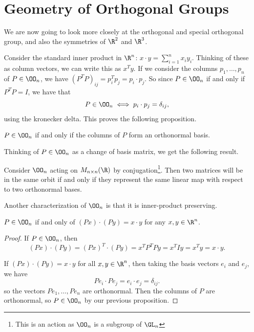 \documentclass[a4]{scrreprt}
\begin{document}
\section{Geometry of Orthogonal Groups}

We are now going to look more closely at the orthogonal and special orthogonal group, and also the symmetries of $\R^2$ and $\R^3$.

Consider the standard inner product in $\R^n$: $x \cdot y = \sum_{i = 1}^n x_i y_i$. Thinking of these as column vectors, we can write this as $x^T y$. If we consider the columns $p_1, \dots, p_n$ of $P \in \OO_n$, we have $(P^T P)_{ij} = p_i^T p_j = p_i \cdot p_j$. So since $P \in \OO_n$ if and only if $P^T P = I$, we have that
$$
P \in \OO_n \iff p_i \cdot p_j = \delta_{ij},
$$
using the kronecker delta. 
This proves the following proposition.

\begin{proposition}
	$P \in \OO_n$ if and only if the columns of $P$ form an orthonormal basis.
\end{proposition}

Thinking of $P \in \OO_n$ as a change of basis matrix, we get the following result.

\begin{proposition}
	Consider $\OO_n$ acting on $M_{n \times n}(\R)$ by conjugation\footnote{This is an action as $\OO_n$ is a subgroup of $\GL_n$}. Then two matrices will be in the same orbit if and only if they represent the same linear map with respect to two orthonormal bases.
\end{proposition}

Another characterization of $\OO_n$ is that it is inner-product preserving.

\begin{proposition}
	$P \in \OO_n$ if and only of $(Px) \cdot (Py) = x \cdot y$ for any $x, y \in \R^n$.
\end{proposition}
\begin{proof}
	If $P \in \OO_n$, then 
	$$
	(Px) \cdot (Py) = (Px)^T \cdot (Py) = x^T P^T P y = x^T I y = x^Ty = x \cdot y.
	$$

	If $(Px) \cdot (Py) = x \cdot y$ for all $x, y \in \R^n$, then taking the basis vectors $e_i$ and $e_j$, we have
	$$
	Pe_i \cdot Pe_j = e_i \cdot e_j = \delta_{ij}.
	$$
	so the vectors $Pe_1,\dots, Pe_n$ are orthonormal. Then the columns of $P$ are orthonormal, so $P \in \OO_n$ by our previous proposition. 
\end{proof}
\end{document}
